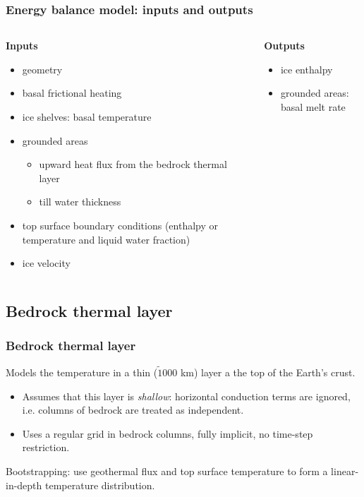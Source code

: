 \documentclass[hide notes,intlimits]{beamer}
\begin{document}
\begin{frame}
  \frametitle{Energy balance model: inputs and outputs}

  \begin{columns}[t]
    \begin{column}{0.5\linewidth}
      \textbf{Inputs}

      \begin{itemize}
      \item geometry
      \item basal frictional heating
      \item ice shelves: basal temperature
      \item grounded areas
        \begin{itemize}
        \item upward heat flux from the bedrock thermal layer
        \item till water thickness
        \end{itemize}
      \item top surface boundary conditions (enthalpy or temperature and
        liquid water fraction)
      \item ice velocity
      \end{itemize}
    \end{column}
    \begin{column}{0.5\linewidth}
      \textbf{Outputs}

      \begin{itemize}
      \item ice enthalpy
      \item grounded areas: basal melt rate
      \end{itemize}
    \end{column}
  \end{columns}

\end{frame}

\subsection{Bedrock thermal layer}
\label{sec:bedrock}

\begin{frame}
  \frametitle{Bedrock thermal layer}
  Models the temperature in a thin ($\tilde 1000$ km) layer a the top
  of the Earth's crust.

  \begin{itemize}
  \item Assumes that this layer is \emph{shallow}: horizontal
    conduction terms are ignored, i.e. columns of bedrock are treated
    as independent.
  \item Uses a regular grid in bedrock columns, fully implicit, no
    time-step restriction.
  \end{itemize}

  Bootstrapping: use geothermal flux and top surface temperature to
  form a linear-in-depth temperature distribution.
\end{frame}
\end{document}
